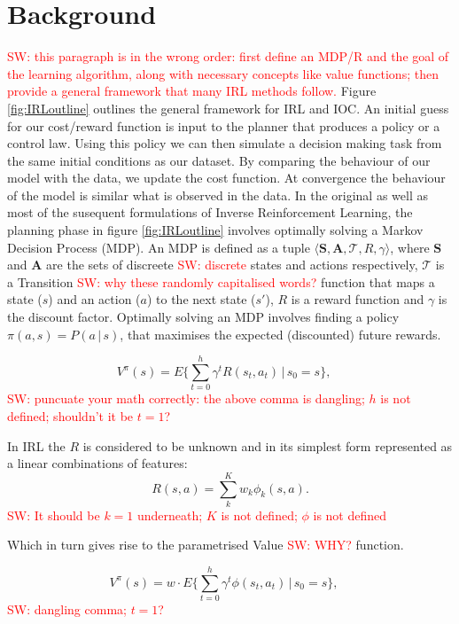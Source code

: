 \documentclass[letterpaper]{article}
\newcommand{\sw}[1]{\textcolor{red}{SW: #1}}
\begin{document}
\section{Background}
\sw{this paragraph is in the wrong order: first define an MDP/R and the goal of the learning algorithm, along with necessary concepts like value functions; then provide a general framework that many IRL methods follow.}
Figure \ref{fig:IRLoutline} outlines the general framework for IRL and IOC. An initial guess for our cost/reward function is input to the planner that produces a policy or a control law. Using this policy we can then simulate a decision making task from the same initial conditions as our dataset. By comparing the behaviour of our model with the data, we update the cost function. At convergence the behaviour of the model is similar what is observed in the data.
In the original as well as most of the susequent formulations of Inverse Reinforcement Learning, the planning phase in figure \ref{fig:IRLoutline} involves optimally solving a Markov Decision Process (MDP). An MDP is defined as a tuple $\langle\mathbf{S},\mathbf{A},\mathcal{T},R,\gamma\rangle$, where $\mathbf{S}$ and $\mathbf{A}$ are the sets of discreete \sw{discrete} states and actions respectively, $\mathcal{T}$ is a Transition \sw{why these randomly capitalised words?} function that maps a state ($s$) and an action ($a$) to the next state ($s'$), $R$ is a reward function and $\gamma$ is the discount factor. 
Optimally solving an MDP involves finding a policy $\pi(a,s) = P(a\,|\,s)$, that maximises the expected (discounted) future rewards.

\begin{equation}
 V^\pi(s) = E\{\sum_{t = 0}^h \gamma^tR(s_t,a_t)\,\vert\, s_0 = s\},\quad
\end{equation}
\sw{puncuate your math correctly: the above comma is dangling; $h$ is not defined; shouldn't it be $t=1$?}

In IRL the $R$ is considered to be unknown and in its simplest form represented as a linear combinations of features:
\begin{equation}
R(s,a) = \sum_k^Kw_k\phi_k(s,a). \label{eq:rew}
\end{equation}
\sw{It should be $k=1$ underneath; $K$ is not defined; $\phi$ is not defined}

Which in turn gives rise to the parametrised Value \sw{WHY?} function.

\begin{equation}
 	V^\pi(s) = w \cdot E\{\sum_{t = 0}^h \gamma^t\phi(s_t,a_t)\,\vert\, s_0 = s\},\quad
\end{equation}
\sw{dangling comma; $t=1$?}
\end{document}
